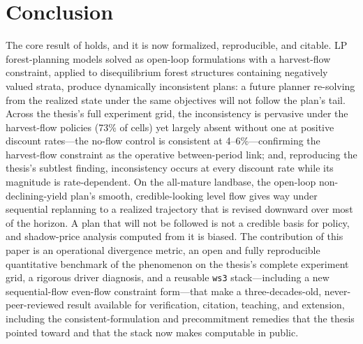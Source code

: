\section{Conclusion}

The core result of \citet{daugherty1991credibility} holds, and it is now formalized, reproducible, and citable. LP forest-planning models solved as open-loop formulations with a harvest-flow constraint, applied to disequilibrium forest structures containing negatively valued strata, produce dynamically inconsistent plans: a future planner re-solving from the realized state under the same objectives will not follow the plan's tail. Across the thesis's full experiment grid, the inconsistency is pervasive under the harvest-flow policies (73\% of cells) yet largely absent without one at positive discount rates---the no-flow control is consistent at 4--6\%---confirming the harvest-flow constraint as the operative between-period link; and, reproducing the thesis's subtlest finding, inconsistency occurs at every discount rate while its magnitude is rate-dependent. On the all-mature landbase, the open-loop non-declining-yield plan's smooth, credible-looking level flow gives way under sequential replanning to a realized trajectory that is revised downward over most of the horizon. A plan that will not be followed is not a credible basis for policy, and shadow-price analysis computed from it is biased. The contribution of this paper is an operational divergence metric, an open and fully reproducible quantitative benchmark of the phenomenon on the thesis's complete experiment grid, a rigorous driver diagnosis, and a reusable \texttt{ws3} stack---including a new sequential-flow even-flow constraint form---that make a three-decades-old, never-peer-reviewed result available for verification, citation, teaching, and extension, including the consistent-formulation and precommitment remedies that the thesis pointed toward and that the stack now makes computable in public.
